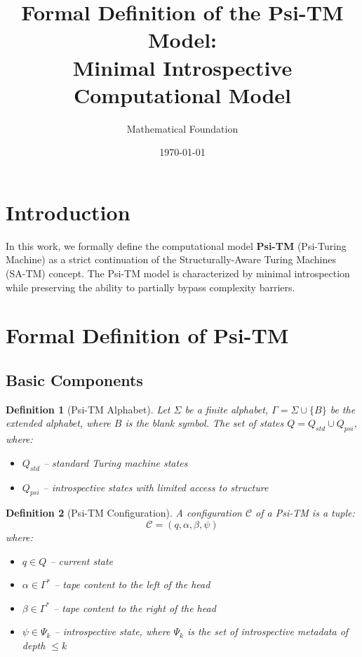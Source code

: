 \documentclass[11pt]{article}
\title{Formal Definition of the Psi-TM Model:\\
Minimal Introspective Computational Model}
\author{Mathematical Foundation}
\date{\today}
\newtheorem{definition}{Definition}
\begin{document}
\maketitle

\section{Introduction}

In this work, we formally define the computational model \textbf{Psi-TM} (Psi-Turing Machine) as a strict continuation of the Structurally-Aware Turing Machines (SA-TM) concept. The Psi-TM model is characterized by minimal introspection while preserving the ability to partially bypass complexity barriers.

\section{Formal Definition of Psi-TM}

\subsection{Basic Components}

\begin{definition}[Psi-TM Alphabet]
Let $\Sigma$ be a finite alphabet, $\Gamma = \Sigma \cup \{B\}$ be the extended alphabet, where $B$ is the blank symbol. The set of states $Q = Q_{std} \cup Q_{psi}$, where:
\begin{itemize}
\item $Q_{std}$ -- standard Turing machine states
\item $Q_{psi}$ -- introspective states with limited access to structure
\end{itemize}
\end{definition}

\begin{definition}[Psi-TM Configuration]
A configuration $\mathcal{C}$ of a Psi-TM is a tuple:
$$\mathcal{C} = (q, \alpha, \beta, \psi)$$
where:
\begin{itemize}
\item $q \in Q$ -- current state
\item $\alpha \in \Gamma^*$ -- tape content to the left of the head
\item $\beta \in \Gamma^*$ -- tape content to the right of the head
\item $\psi \in \Psi_k$ -- introspective state, where $\Psi_k$ is the set of introspective metadata of depth $\leq k$
\end{itemize}
\end{definition}
\end{document}
